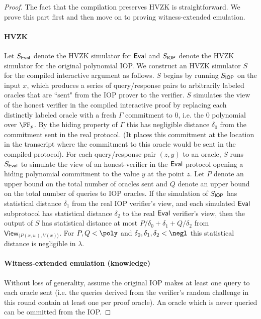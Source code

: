 \begin{proof}
The fact that the compilation preserves HVZK is straightforward. We prove this part first and then move on to proving witness-extended emulation. 

\paragraph{HVZK} Let $S_{\textsf{{Eval}}}$ denote the HVZK simulator for $\textsf{{Eval}}$ and $S_{\textsf{{IOP}}}$ denote the HVZK simulator for the original polynomial IOP. We construct an HVZK simulator $S$ for the compiled interactive argument as follows. 
$S$ begins by running $S_{\textsf{{IOP}}}$ on the input $x$, which produces a series of query/response pairs to arbitrarily labeled oracles that are ``sent" from the IOP prover to the verifier. $S$ simulates the view of the honest verifier in the compiled interactive proof by replacing each distinctly labeled oracle with a fresh $\Gamma$ commitment to $0$, i.e. the $0$ polynomial over $\FF_p$. By the hiding property of $\Gamma$ this has negligible distance $\delta_0$ from the commitment sent in the real protocol.
(It places this commitment at the location in the transcript where the commitment to this oracle would be sent in the compiled protocol).
 For each query/response pair $(z, y)$ to an oracle, $S$ runs $S_{\textsf{{Eval}}}$ to simulate the view of an honest-verifier in the $\textsf{{Eval}}$ protocol opening a hiding polynomial commitment to the value $y$ at the point $z$. Let $P$ denote an upper bound on the total number of oracles sent and $Q$ denote an upper bound on the total number of queries to IOP oracles. 
If the simulation of $S_{\textsf{{IOP}}}$ has statistical distance $\delta_1$ from the real IOP verifier's view, and each simulated $\textsf{{Eval}}$ subprotocol has statistical distance $\delta_2$ to the real $\textsf{{Eval}}$ verifier's view, then the output of $S$ has statistical distance at most $P/\delta_0 + \delta_1 + Q/\delta_2$ from $\textsf{View}_{\langle P(x, w), V(x) \rangle}$. For $P, Q < \poly$ and $\delta_0, \delta_1, \delta_2 < \negl$ this statistical distance is negligible in $\lambda$. 

\paragraph{Witness-extended emulation (knowledge)}
Without loss of generality, assume the original IOP makes at least one query to each oracle sent (i.e. the queries derived from the verifier's random challenge in this round contain at least one per proof oracle). An oracle which is never queried can be ommitted from the IOP.


\end{proof}
